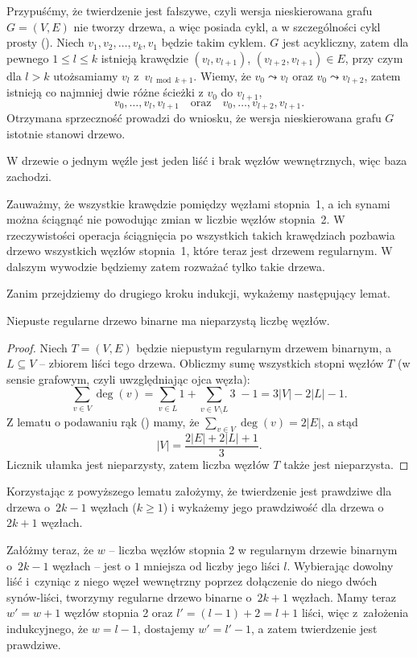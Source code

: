 \exercise %
Przypuśćmy, że twierdzenie jest fałszywe, czyli wersja nieskierowana grafu $G=(V,E)$ nie tworzy drzewa, a więc posiada cykl, a w szczególności cykl prosty (). Niech $v_1,v_2,\dots,v_k,v_1$ będzie takim cyklem. $G$ jest acykliczny, zatem dla pewnego $1\le l\le k$ istnieją krawędzie $(v_l,v_{l+1})$, $(v_{l+2},v_{l+1})\in E$, przy czym dla $l>k$ utożsamiamy $v_l$ z~$v_{l\bmod k+1}$. Wiemy, że $v_0\leadsto v_l$ oraz $v_0\leadsto v_{l+2}$, zatem istnieją co najmniej dwie różne ścieżki z $v_0$ do $v_{l+1}$,
\[
	v_0,\dots,v_l,v_{l+1} \quad\text{oraz}\quad v_0,\dots,v_{l+2},v_{l+1}.
\]
Otrzymana sprzeczność prowadzi do wniosku, że wersja nieskierowana grafu $G$ istotnie stanowi drzewo.

\exercise %
W drzewie o jednym węźle jest jeden liść i brak węzłów wewnętrznych, więc baza zachodzi.

Zauważmy, że wszystkie krawędzie pomiędzy węzłami stopnia~1, a ich synami można ściągnąć nie powodując zmian w liczbie węzłów stopnia~2. W rzeczywistości operacja ściągnięcia po wszystkich takich krawędziach pozbawia drzewo wszystkich węzłów stopnia~1, które teraz jest drzewem regularnym. W dalszym wywodzie będziemy zatem rozważać tylko takie drzewa.

Zanim przejdziemy do drugiego kroku indukcji, wykażemy następujący lemat.
\begin{lemat}
	Niepuste regularne drzewo binarne ma nieparzystą liczbę węzłów.
\end{lemat}
\begin{proof}
Niech $T=(V,E)$ będzie niepustym regularnym drzewem binarnym, a~$L\subseteq V$ -- zbiorem liści tego drzewa. Obliczmy sumę wszystkich stopni węzłów $T$ (w sensie grafowym, czyli uwzględniając ojca węzła):
\[
	\sum_{v\in V}\deg(v) = \sum_{v\in L}1+\sum_{v\in V\setminus L}\!\!\!3\;-1=3|V|-2|L|-1.
\]
Z lematu o podawaniu rąk () mamy, że $\sum_{v\in V}\deg(v) = 2|E|$, a stąd
\[
	|V| = \frac{2|E|+2|L|+1}{3}.
\]
Licznik ułamka jest nieparzysty, zatem liczba węzłów $T$ także jest nieparzysta.

\end{proof}

Korzystając z powyższego lematu założymy, że twierdzenie jest prawdziwe dla drzewa o~$2k-1$ węzłach ($k\ge1$) i wykażemy jego prawdziwość dla drzewa o $2k+1$ węzłach.

Załóżmy teraz, że $w$ -- liczba węzłów stopnia 2 w regularnym drzewie binarnym o~$2k-1$ węzłach -- jest o $1$ mniejsza od liczby jego liści $l$. Wybierając dowolny liść i~czyniąc z niego węzeł wewnętrzny poprzez dołączenie do niego dwóch synów-liści, tworzymy regularne drzewo binarne o~$2k+1$ węzłach. Mamy teraz $w'=w+1$ węzłów stopnia 2 oraz $l'=(l-1)+2=l+1$ liści, więc z~założenia indukcyjnego, że $w=l-1$, dostajemy $w'=l'-1$, a zatem twierdzenie jest prawdziwe.

